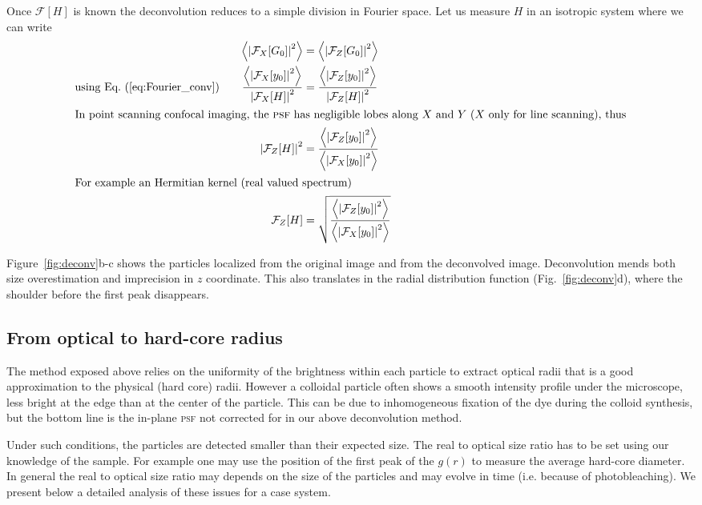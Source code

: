 \documentclass[8.5pt,twoside,twocolumn]{article}
\begin{document}
Once $\mathcal{F}[H]$ is known the deconvolution reduces to a simple division in Fourier space. Let us measure $H$ in an isotropic system where we can write
\begin{align}
\left\langle \left|\mathcal{F}_X[G_0]\right|^2 \right\rangle  &= \left\langle \left|\mathcal{F}_Z[G_0]\right|^2 \right\rangle \\
\text{using Eq.~(\ref{eq:Fourier_conv})}\qquad 
\frac{\left\langle\left|\mathcal{F}_X[y_0]\right|^2 \right\rangle}{\left|\mathcal{F}_X[H]\right|^2}  &= \frac{\left\langle \left|\mathcal{F}_Z[y_0]\right|^2\right\rangle}{\left|\mathcal{F}_Z[H]\right|^2} \\
\intertext{In point scanning confocal imaging, the \textsc{psf} has negligible lobes along $X$ and $Y$ ($X$ only for line scanning), thus}
\left|\mathcal{F}_Z[H]\right|^2 &= \frac{\left\langle \left|\mathcal{F}_Z[y_0]\right|^2\right\rangle}{\left\langle\left|\mathcal{F}_X[y_0]\right|^2 \right\rangle}\\
\intertext{For example an Hermitian kernel (real valued spectrum)}
\mathcal{F}_Z[H] &= \sqrt{\frac{\left\langle \left|\mathcal{F}_Z[y_0]\right|^2\right\rangle}{\left\langle\left|\mathcal{F}_X[y_0]\right|^2 \right\rangle}}
\end{align}

Figure~\ref{fig:deconv}b-c shows the particles localized from the original image and from the deconvolved image. Deconvolution mends both size overestimation and imprecision in $z$ coordinate. This also translates in the radial distribution function (Fig.~\ref{fig:deconv}d), where the shoulder before the first peak disappears.

\subsection{From optical to hard-core radius}

The method exposed above relies on the uniformity of the brightness within each particle to extract optical radii that is a good approximation to the physical (hard core) radii. However a colloidal particle often shows a smooth intensity profile under the microscope, less bright at the edge than at the center of the particle. This can be due to inhomogeneous fixation of the dye during the colloid synthesis, but the bottom line is the in-plane \textsc{psf} not corrected for in our above deconvolution method.

Under such conditions, the particles are detected smaller than their expected size. The real to optical size ratio has to be set using our knowledge of the sample. For example one may use the position of the first peak of the $g(r)$ to measure the average hard-core diameter. In general the real to optical size ratio may depends on the size of the particles and may evolve in time (i.e. because of photobleaching). We present below a detailed analysis of these issues for a case system.
\end{document}
